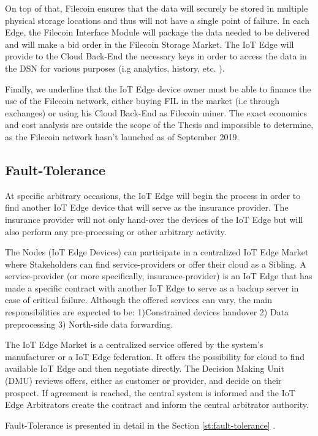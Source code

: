 On top of that, Filecoin ensures that the data will securely be stored in multiple physical storage locations and thus will not have a single point of failure. In each Edge, the Filecoin Interface Module will package the data needed to be delivered and will make a bid order in the Filecoin Storage Market. The IoT Edge will provide to the Cloud Back-End the necessary keys in order to access the data in the DSN for various purposes (i.g analytics, history, etc. ).  

Finally, we underline that the IoT Edge device owner must be able to finance the use of the Filecoin network, either buying FIL in the market (i.e through exchanges) or using his Cloud Back-End as Filecoin miner. The exact economics and cost analysis are outside the scope of the Thesis and impossible to determine, as the Filecoin network hasn’t launched as of September 2019.
 
\subsection{Fault-Tolerance}

At specific arbitrary occasions, the IoT Edge will begin the process in order to find another IoT Edge device that will serve as the insurance provider. The insurance provider will not only hand-over the devices of the IoT Edge but will also perform any pre-processing or other arbitrary activity. 

The Nodes (IoT Edge Devices) can participate in a centralized IoT Edge Market where Stakeholders can find service-providers or offer their cloud as a Sibling. A service-provider (or more specifically, insurance-provider) is an IoT Edge that has made a specific contract with another IoT Edge to serve as a backup server in case of critical failure. Although the offered services can vary, the main responsibilities are expected to be: 1)Constrained devices handover 2) Data preprocessing 3) North-side data forwarding.

The IoT Edge Market is a centralized service offered by the system’s manufacturer or a IoT Edge federation. It offers the possibility for cloud to find available IoT Edge and then negotiate directly. The Decision Making Unit (DMU) reviews offers, either as customer or provider, and decide on their prospect. If agreement is reached, the central system is informed and the IoT Edge Arbitrators create the contract and inform the central arbitrator authority.
 
Fault-Tolerance is presented in detail in the Section \ref{st:fault-tolerance} .

